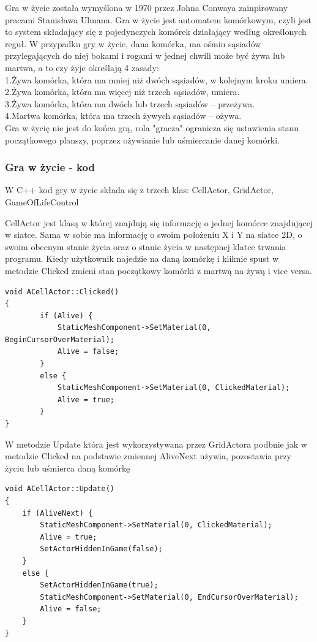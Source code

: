 \documentclass[a4paper,12pt,reqno]{article}
\begin{document}
Gra w życie została wymyślona w 1970 przez Johna Conwaya zainpirowany pracami Stanisława Ulmana. Gra w życie jest automatem komórkowym, czyli jest to system składający się z pojedynczych komórek działający według określonych reguł.\cite{game_of_life} W przypadku gry w życie, dana komórka, ma ośmiu sąsiadów przylegających do niej bokami i rogami w jednej chwili może być żywa lub martwa, a to czy żyje określają 4 zasady:\\
1.Żywa komórka, która ma mniej niż dwóch sąsiadów, w kolejnym kroku umiera. \\
2.Żywa komórka, która ma więcej niż trzech sąsiadów, umiera.\\
3.Żywa komórka, która ma dwóch lub trzech sąsiadów – przeżywa.\\
4.Martwa komórka, która ma trzech żywych sąsiadów – ożywa.\\

Gra w życię nie jest do końca grą, rola "gracza" ogranicza się ustawienia stanu początkowego planszy, poprzez ożywianie lub uśmiercanie danej komórki.\cite{game_of_life_wiki}


\subsubsection{Gra w życie - kod}

W C++ kod gry w życie składa się z trzech klas: CellActor, GridActor, GameOfLifeControl

CellActor jest klasą w której znajdują się informację o jednej komórce znajdującej w siatce. Sama w sobie ma informację o swoim położeniu X i Y na siatce 2D, o swoim obecnym stanie życia oraz o stanie życia w następnej klatce trwania programu. 
Kiedy użytkownik najedzie na daną komórkę i kliknie spust w metodzie Clicked zmieni stan początkowy komórki z martwą na żywą i vice versa.
\begin{lstlisting}
void ACellActor::Clicked()
{
		if (Alive) {
			StaticMeshComponent->SetMaterial(0, BeginCursorOverMaterial);
			Alive = false;
		}
		else {
			StaticMeshComponent->SetMaterial(0, ClickedMaterial);
			Alive = true;
		}
}
\end{lstlisting}

W metodzie Update która jest wykorzystywana przez GridActora podbnie jak w metodzie Clicked na podstawie zmiennej AliveNext używia, pozostawia przy życiu lub uśmierca daną komórkę

\begin{lstlisting} 
void ACellActor::Update()
{
	if (AliveNext) {
		StaticMeshComponent->SetMaterial(0, ClickedMaterial);
		Alive = true;
		SetActorHiddenInGame(false);
	}
	else {
		SetActorHiddenInGame(true);
		StaticMeshComponent->SetMaterial(0, EndCursorOverMaterial);
		Alive = false;
	}
}
\end{lstlisting}
\end{document}

